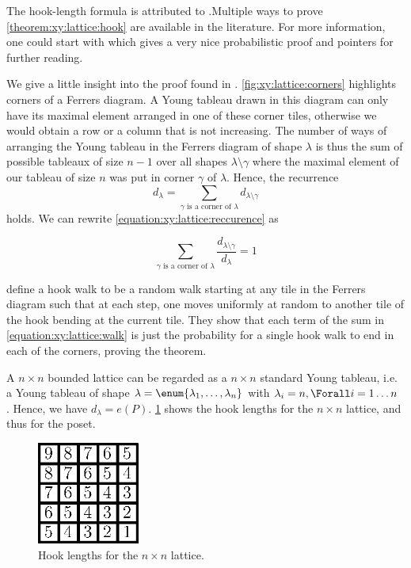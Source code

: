 The hook-length formula is attributed to \citet*{frame:1954}.Multiple ways to
prove \ref{theorem:xy:lattice:hook} are available in the literature. For more
information, one could start with \citet*{greene:1979} which gives a very nice
probabilistic proof and pointers for further reading.

We give a little insight into the proof found in \citet*{greene:1979}.
\ref{fig:xy:lattice:corners} highlights corners of a Ferrers diagram. A Young
tableau drawn in this diagram can only have its maximal element arranged in
one of these corner tiles, otherwise we would obtain a row or a column that is
not increasing. The number of ways of arranging the Young tableau in the
Ferrers diagram of shape \(\lambda\) is thus the sum of possible tableaux of
size \(n-1\) over all shapes \(\lambda \setminus \gamma\) where the maximal
element of our tableau of size \(n\) was put in corner \(\gamma\) of
\(\lambda\). Hence, the recurrence
\begin{equation}\label{equation:xy:lattice:reccurence}
d_{\lambda} = \sum_{\gamma \text{ is a corner of } \lambda} d_{\lambda
\setminus \gamma}
\end{equation}
holds. We can rewrite \ref{equation:xy:lattice:reccurence} as

\begin{equation}\label{equation:xy:lattice:walk}
\sum_{\gamma \text{ is a corner of } \lambda} \frac{d_{\lambda
\setminus \gamma}}{d_{\lambda}} = 1
\end{equation}

\citet*{greene:1979} define a hook walk to be a random walk starting at
any tile in the Ferrers diagram such that at each step, one moves uniformly at
random to another tile of the hook bending at the current tile.
They show that each term of the sum in \ref{equation:xy:lattice:walk} is just
the probability for a single hook walk to end in each of the corners, proving
the theorem.

A \( n \times n \) bounded lattice can be regarded as a \( n \times n \)
standard Young tableau, i.e. a Young tableau of shape
\( \lambda = \enum{ \lambda_1 , \ldots , \lambda_n } \)
with
\( \lambda_i = n, \Forall i = 1 \ldots n \)
. Hence, we have
\( d_{\lambda} = e(P) \). \ref{fig:xy:lattice:xyhooks} shows the hook lengths
for the \( n \times n \) lattice, and thus for the \XY poset.

\begin{figure}
\centering
\includegraphics[width=0.3\textwidth]{fig/x+y/lattice/xyhooks}
\caption{Hook lengths for the \( n \times n \) lattice.}
\label{fig:xy:lattice:xyhooks}
\end{figure}


